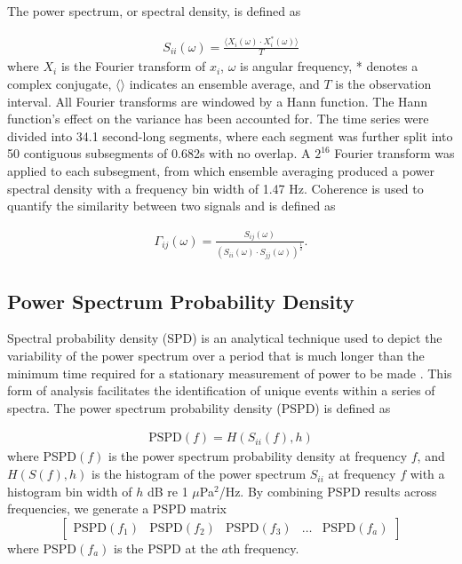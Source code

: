 \documentclass[12pt,journal,onecolumn]{IEEEtran}
\begin{document}
The power spectrum, or spectral density, is defined as 

\begin{align}
S_{ii}(\omega) = \frac{\langle X_i(\omega)\cdot X_i^*(\omega) \rangle}{T}
\label{power}
\end{align}
where $X_i$ is the Fourier transform of $x_i$, $\omega$ is angular frequency, * denotes a complex conjugate, $\langle \rangle$ indicates an ensemble average, and $T$ is the observation interval. All Fourier transforms are windowed by a Hann function. The Hann function's effect on the variance has been accounted for. The time series were divided into 34.1 second-long segments, where each segment was further split into 50 contiguous subsegments of 0.682s with no overlap. A $2^{16}$ Fourier transform was applied to each subsegment, from which ensemble averaging produced a power spectral density with a frequency bin width of 1.47 Hz. Coherence is used to quantify the similarity between two signals and is defined as 

\begin{align}
\Gamma_{ij}(\omega) = \frac{S_{ij}(\omega)}{(S_{ii}(\omega) \cdot S_{jj}(\omega))^{\frac{1}{2}}}.
\label{coherence}
\end{align}



\subsection{Power Spectrum Probability Density}

Spectral probability density (SPD) is an analytical technique used to depict the variability of the power spectrum over a period that is much longer than the minimum time required for a stationary measurement of power to be made \cite{merchant}. This form of analysis facilitates the identification of unique events within a series of spectra. The power spectrum probability density (PSPD) is defined as

\begin{align}
\text{PSPD}(f) = H(S_{ii}(f),h)
\label{PSPD_definition}
\end{align}
where PSPD$(f)$ is the power spectrum probability density at frequency $f$, and $H(S(f),h)$ is the histogram of the power spectrum $S_{ii}$ at frequency $f$ with a histogram bin width of $h$  dB re 1 $\mu$Pa$^2$/Hz. By combining PSPD results across frequencies, we generate a PSPD matrix 
\begin{equation}
\begin{bmatrix}
\text{PSPD}(f_1) & \text{PSPD}(f_2) & \text{PSPD}(f_3) & \dots &\text{PSPD}(f_a)
\end{bmatrix}
\label{PSPD_matrix}
\end{equation}
where PSPD$(f_a)$ is the PSPD at the $a$th frequency. 
\end{document}
